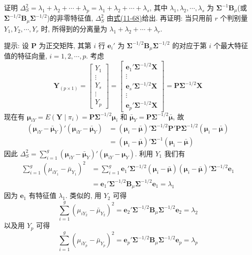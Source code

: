 \quad 证明 $\Delta_S^2=\lambda_1+\lambda_2+\cdots+\lambda_p=\lambda_1+\lambda_2+\cdots+\lambda_s$, 其中 $\lambda_1,\lambda_2,\cdots,\lambda_s$ 为 $\boldsymbol{\Sigma}^{-1}\mathbf{B}_\mu$(或 $\boldsymbol{\Sigma}^{-1/2}\mathbf{B}_\mu\boldsymbol{\Sigma}^{-1/2}$)的非零特征值, $\Delta_S^2$ 由\hyperref[eq:11-68]{式(11-68)}给出. 再证明: 当只用前 $r$ 个判别量 $Y_1,Y_2,\cdots,Y_r$ 时, 所得到的分离量为 $\lambda_1+\lambda_2+\cdots+\lambda_r$.

提示: 设 $\mathbf{P}$ 为正交矩阵, 其第 $i$ 行 $\mathbf{e}_i'$ 为 $\boldsymbol{\Sigma}^{-1/2}\mathbf{B}_\mu\boldsymbol{\Sigma}^{-1/2}$ 的对应于第 $i$ 个最大特征值的特征向量, $i=1,2,\cdots,p$. 考虑
\[
\mathbf{Y}_{(p\times 1)}=\begin{bmatrix}Y_1\\\vdots\\Y_s\\\vdots\\Y_p\end{bmatrix}=\begin{bmatrix}\mathbf{e}_1'\boldsymbol{\Sigma}^{-1/2}\mathbf{X}\\\vdots\\\mathbf{e}_s'\boldsymbol{\Sigma}^{-1/2}\mathbf{X}\\\vdots\\\mathbf{e}_p'\boldsymbol{\Sigma}^{-1/2}\mathbf{X}\end{bmatrix}=\mathbf{P}\boldsymbol{\Sigma}^{-1/2}\mathbf{X}
\]
现在有 $\boldsymbol{\mu}_{iY}=E(\mathbf{Y}\mid \pi_i)=\mathbf{P}\boldsymbol{\Sigma}^{-1/2}\boldsymbol{\mu}_i$ 和 $\bar{\boldsymbol{\mu}}_Y=\mathbf{P}\boldsymbol{\Sigma}^{-1/2}\bar{\boldsymbol{\mu}}$, 故
\[
\begin{aligned}
(\boldsymbol{\mu}_{iY}-\bar{\boldsymbol{\mu}}_Y)'(\boldsymbol{\mu}_{iY}-\bar{\boldsymbol{\mu}}_Y)&=(\boldsymbol{\mu}_i-\bar{\boldsymbol{\mu}})'\boldsymbol{\Sigma}^{-1/2}\mathbf{P}'\mathbf{P}\boldsymbol{\Sigma}^{-1/2}(\boldsymbol{\mu}_i-\bar{\boldsymbol{\mu}})\\
&=(\boldsymbol{\mu}_i-\bar{\boldsymbol{\mu}})'\boldsymbol{\Sigma}^{-1}(\boldsymbol{\mu}_i-\bar{\boldsymbol{\mu}})
\end{aligned}
\]
因此 $\Delta_S^2=\sum_{i=1}^{g}(\boldsymbol{\mu}_{iY}-\bar{\boldsymbol{\mu}}_Y)'(\boldsymbol{\mu}_{iY}-\boldsymbol{\mu}_Y)$. 利用 $Y_1$ 我们有
\[
\begin{aligned}
\sum_{i=1}^{g}(\mu_{iY_1}-\bar{\mu}_{Y_1})^2&=\sum_{i=1}^{g}\mathbf{e}_1'\boldsymbol{\Sigma}^{-1/2}(\boldsymbol{\mu}_i-\bar{\boldsymbol{\mu}})(\boldsymbol{\mu}_i-\bar{\boldsymbol{\mu}})'\boldsymbol{\Sigma}^{-1/2}\mathbf{e}_1\\
&=\mathbf{e}_1'\boldsymbol{\Sigma}^{-1/2}\mathbf{B}_\mu\boldsymbol{\Sigma}^{-1/2}\mathbf{e}_1=\lambda_1
\end{aligned}
\]
因为 $\mathbf{e}_1$ 有特征值 $\lambda_1$. 类似的, 用 $Y_2$ 可得
\[
\sum_{i=1}^{g}(\mu_{iY_2}-\bar{\mu}_{Y_2})^2=\mathbf{e}_2'\boldsymbol{\Sigma}^{-1/2}\mathbf{B}_\mu\boldsymbol{\Sigma}^{-1/2}\mathbf{e}_2=\lambda_2
\]
以及用 $Y_p$ 可得
\[
\sum_{i=1}^{g}(\mu_{iY_p}-\bar{\mu}_{Y_p})^2=\mathbf{e}_p'\boldsymbol{\Sigma}^{-1/2}\mathbf{B}_\mu\boldsymbol{\Sigma}^{-1/2}\mathbf{e}_p=\lambda_p
\]
